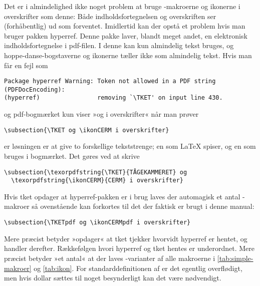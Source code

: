 \documentclass[a4paper,article,oneside]{memoir}
\newcommand{\pakkenavn}[1]{\textsf{#1}}
\newcommand{\ptket}{\pakkenavn{tket}\xspace}
\newcommand*{\optionname}[1]{\textcolor{option}{#1}}
\begin{document}
Det er i almindelighed ikke noget problem at bruge -makroerne
og ikonerne i overskrifter som denne: Både indholdsfortegnelsen og
overskriften ser (forhåbentlig) ud som forventet. Imidlertid kan der
opstå et problem hvis man bruger pakken \pakkenavn{hyperref}. Denne
pakke laver, blandt meget andet, en elektronisk indholdsfortegnelse i
pdf-filen. I denne kan kun almindelig tekst bruges, og
hoppe-danse-bogstaverne og ikonerne tæller ikke som almindelig
tekst. Hvis man får en fejl som
\begin{lstlisting}
Package hyperref Warning: Token not allowed in a PDF string (PDFDocEncoding):
(hyperref)                removing `\TKET' on input line 430.
\end{lstlisting}
og pdf-bogmærket kun viser »og i overskrifter« når man prøver
\begin{lstlisting}
\subsection{\TKET og \ikonCERM i overskrifter}
\end{lstlisting}
er løsningen er at give to
forskellige tekststrenge; en som \LaTeX{} spiser, og en som bruges i
bogmærket. Det gøres ved at skrive
\begin{lstlisting}
\subsection{\texorpdfstring{\TKET}{TÅGEKAMMERET} og
  \texorpdfstring{\ikonCERM}{CERM} i overskrifter}
\end{lstlisting}

Hvis \ptket opdager at \pakkenavn{hyperref}-pakken er i brug laves der
automagisk et antal -makroer så ovenstående kan forkortes
til det der faktisk er brugt i denne manual:
\begin{lstlisting}
\subsection{\TKETpdf og \ikonCERMpdf i overskrifter}
\end{lstlisting}
Mere præcist betyder »opdager« at \ptket tjekker 
hvorvidt \pakkenavn{hyperref} er hentet, og handler
derefter. Rækkefølgen hvori \pakkenavn{hyperref} og \ptket hentes er
underordnet. Mere præcist betyder »et antal« at der laves
-varianter af alle makroerne i \autoref{tab:simple-makroer}
og \autoref{tab:ikon}. For standarddefinitionen af  er det
egentlig overflødigt, men hvis \optionname{dollar} sættes til noget
besynderligt kan det være nødvendigt.
\end{document}
